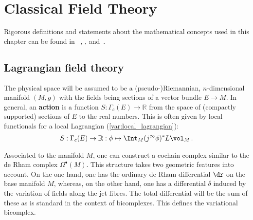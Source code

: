 \chapter{Classical Field Theory}\label{chapter:classical_fields}

    Rigorous definitions and statements about the mathematical concepts used in this chapter can be found in ~, ,  and~.

    \minitoc

\section{Lagrangian field theory}

    The physical space will be assumed to be a (pseudo-)Riemannian, $n$-dimensional manifold $(M,g)$ with the fields being sections of a vector bundle $E\rightarrow M$. In general, an \textbf{action} is a function $S:\Gamma_c(E)\rightarrow\mathbb{R}$ from the space of (compactly supported) sections of $E$ to the real numbers. This is often given by local functionals for a local Lagrangian (\cref{var:local_lagrangian}):
    \begin{gather}
        S:\Gamma_c(E)\rightarrow\mathbb{R}:\phi\mapsto\Int_M(j^\infty\phi)^*L\vol_M\,.
    \end{gather}

    Associated to the manifold $M$, one can construct a cochain complex similar to the de Rham complex $\Omega^\bullet(M)$. This structure takes two geometric features into account. On the one hand, one has the ordinary de Rham differential $\dr$ on the base manifold $M$, whereas, on the other hand, one has a differential $\delta$ induced by the variation of fields along the jet fibres. The total differential will be the sum of these as is standard in the context of bicomplexes. This defines the variational bicomplex.

